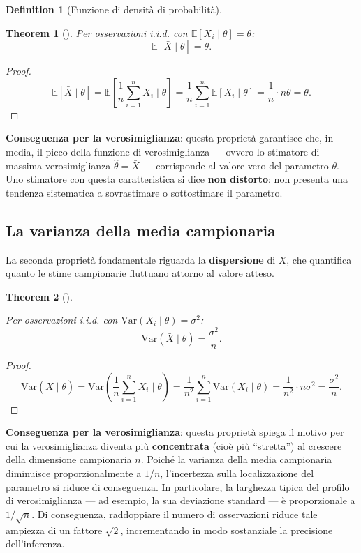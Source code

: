 \documentclass[
  letterpaper,
  DIV=11,
  numbers=noendperiod,
  oneside]{scrreprt}
\theoremstyle{definition}
\theoremstyle{plain}
\newtheorem{theorem}{Theorem}[chapter]
\theoremstyle{definition}
\newtheorem{definition}{Definition}[chapter]
\theoremstyle{remark}
\begin{document}
\begin{definition}[Funzione di densità di
probabilità]
\begin{theorem}[]
Per osservazioni i.i.d. con \(\mathbb{E}[X_i \mid \theta] = \theta\): \[
\mathbb{E}[\bar{X} \mid \theta] = \theta.
\]

\end{theorem}

\begin{proof}
\[
\mathbb{E}[\bar{X} \mid \theta] = \mathbb{E}\left[\frac{1}{n}\sum_{i=1}^n X_i \; \bigg| \; \theta\right] = \frac{1}{n}\sum_{i=1}^n \mathbb{E}[X_i \mid \theta] = \frac{1}{n} \cdot n\theta = \theta.
\]
\end{proof}

\textbf{Conseguenza per la verosimiglianza}: questa proprietà garantisce
che, in media, il picco della funzione di verosimiglianza --- ovvero lo
stimatore di massima verosimiglianza \(\hat{\theta} = \bar{X}\) ---
corrisponde al valore vero del parametro \(\theta\). Uno stimatore con
questa caratteristica si dice \textbf{non distorto}: non presenta una
tendenza sistematica a sovrastimare o sottostimare il parametro.

\subsection{La varianza della media
campionaria}\label{la-varianza-della-media-campionaria}

La seconda proprietà fondamentale riguarda la \textbf{dispersione} di
\(\bar{X}\), che quantifica quanto le stime campionarie fluttuano
attorno al valore atteso.

\begin{theorem}[]\protect\hypertarget{thm-var-mean}{}\label{thm-var-mean}

Per osservazioni i.i.d. con \(\text{Var}(X_i \mid \theta) = \sigma^2\):
\[
\text{Var}(\bar{X} \mid \theta) = \frac{\sigma^2}{n}.
\]

\end{theorem}

\begin{proof}
\[
\text{Var}(\bar{X} \mid \theta) = \text{Var}\left(\frac{1}{n}\sum_{i=1}^n X_i \; \bigg| \; \theta\right) = \frac{1}{n^2}\sum_{i=1}^n \text{Var}(X_i \mid \theta) = \frac{1}{n^2} \cdot n\sigma^2 = \frac{\sigma^2}{n}.
\]
\end{proof}

\textbf{Conseguenza per la verosimiglianza}: questa proprietà spiega il
motivo per cui la verosimiglianza diventa più \textbf{concentrata} (cioè
più ``stretta'') al crescere della dimensione campionaria \(n\). Poiché
la varianza della media campionaria diminuisce proporzionalmente a
\(1/n\), l'incertezza sulla localizzazione del parametro si riduce di
conseguenza. In particolare, la larghezza tipica del profilo di
verosimiglianza --- ad esempio, la sua deviazione standard --- è
proporzionale a \(1/\sqrt{n}\). Di conseguenza, raddoppiare il numero di
osservazioni riduce tale ampiezza di un fattore \(\sqrt{2}\),
incrementando in modo sostanziale la precisione dell'inferenza.


\end{definition}
\end{document}
